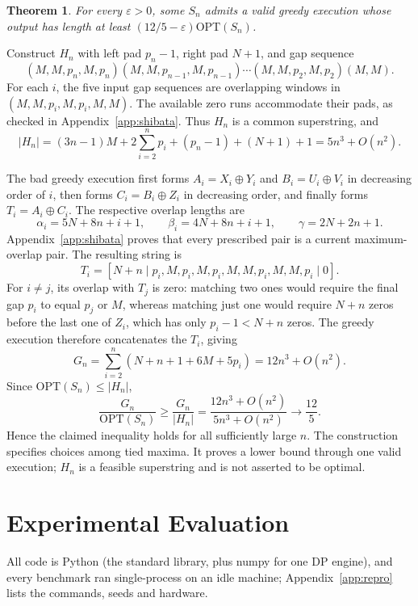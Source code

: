 \documentclass[11pt,a4paper]{article}   %
\makeatletter
\renewenvironment{proof}[1][\proofname]{\par
  \pushQED{\qed}%
  \normalfont \topsep1\p@\@plus1\p@\relax
  \trivlist
  \item[\hskip\labelsep\itshape #1\@addpunct{.}]\ignorespaces
}{\popQED\endtrivlist\@endpefalse}
\theoremstyle{compact}
\newtheorem{theorem}{Theorem}[section]
\theoremstyle{compactdef}
\newcommand{\OPT}{\mathrm{OPT}}
\newcommand{\GR}{G}                         %
\makeatother
\begin{document}
\begin{theorem}\label{thm:lower-twelve-fifths}
For every $\varepsilon>0$, some $S_n$ admits a valid greedy execution
whose output has length at least $(12/5-\varepsilon)\OPT(S_n)$.
\end{theorem}
\begin{proof}
Construct $H_n$ with left pad $p_n-1$, right pad $N+1$, and gap sequence
\[
 (M,M,p_n,M,p_n)(M,M,p_{n-1},M,p_{n-1})
 \cdots(M,M,p_2,M,p_2)(M,M).
\]
For each $i$, the five input gap sequences are overlapping windows in
$(M,M,p_i,M,p_i,M,M)$. The available zero runs accommodate their pads,
as checked in Appendix~\ref{app:shibata}. Thus $H_n$ is a common
superstring, and
\[
 |H_n|=(3n-1)M+2\sum_{i=2}^np_i+(p_n-1)+(N+1)+1
       =5n^3+O(n^2).
\]

The bad greedy execution first forms
$A_i=X_i\oplus Y_i$ and $B_i=U_i\oplus V_i$ in decreasing order of $i$,
then forms $C_i=B_i\oplus Z_i$ in decreasing order, and finally forms
$T_i=A_i\oplus C_i$. The respective overlap lengths are
\[
 \alpha_i=5N+8n+i+1,\qquad
 \beta_i=4N+8n+i+1,\qquad
 \gamma=2N+2n+1.
\]
Appendix~\ref{app:shibata} proves that every prescribed pair is a current
maximum-overlap pair. The resulting string is
\[
 T_i=[N+n\mid p_i,M,p_i,M,p_i,M,M,p_i,M,M,p_i\mid0].
\]
For $i\ne j$, its overlap with $T_j$ is zero: matching two ones would
require the final gap $p_i$ to equal $p_j$ or $M$, whereas matching just
one would require $N+n$ zeros before the last one of $Z_i$, which has
only $p_i-1<N+n$ zeros. The greedy execution therefore concatenates the
$T_i$, giving
\[
 \GR_n=\sum_{i=2}^n(N+n+1+6M+5p_i)=12n^3+O(n^2).
\]
Since $\OPT(S_n)\le|H_n|$,
\[
 \frac{\GR_n}{\OPT(S_n)}
 \ge\frac{\GR_n}{|H_n|}
 =\frac{12n^3+O(n^2)}{5n^3+O(n^2)}
 \longrightarrow\frac{12}{5}.
\]
Hence the claimed inequality holds for all sufficiently large $n$.
\end{proof}
The construction specifies choices among tied maxima. It proves a lower
bound through one valid execution; $H_n$ is a feasible superstring and is
not asserted to be optimal.

\section{Experimental Evaluation}\label{sec:experiments}

All code is Python (the standard library, plus numpy for one DP engine),
and every benchmark ran single-process on an idle machine;
Appendix~\ref{app:repro} lists the commands, seeds and hardware.
\end{document}
